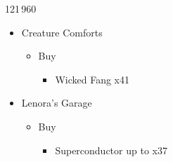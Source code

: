 \begin{shop}{121\,960}
\begin{itemize}
		\item Creature Comforts
			\begin{itemize}
				\item Buy
					\begin{itemize}
						\item Wicked Fang x41
					\end{itemize}
			\end{itemize}
		\item Lenora's Garage
			\begin{itemize}
				\item Buy
					\begin{itemize}
						\item Superconductor up to x37
					\end{itemize}
			\end{itemize}									
	\end{itemize}
\end{shop}

